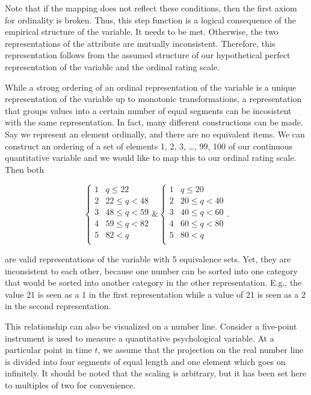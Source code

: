 \documentclass[utf8]{FrontiersinVancouver}
\begin{document}
Note that if the mapping does not reflect these conditions, then the first axiom for ordinality is broken. Thus, this step function is a logical consequence of the empirical structure of the variable. It needs to be met. Otherwise, the two representations of the attribute are mutually inconsistent. Therefore, this representation follows from the assumed structure of our hypothetical perfect representation of the variable and the ordinal rating scale. 

While a strong ordering of an ordinal representation of the variable is a unique representation of the variable up to monotonic transformations, a representation that groups values into a certain number of equal segments can be incosistent with the same representation. In fact, many different constructions can be made. Say we represent an element ordinally, and there are no equivalent items. We can construct an ordering of a set of elements {1, 2, 3, \ldots, 99, 100} of our continuous quantitative variable and we would like to map this to our ordinal rating scale. Then both

\[
\begin{cases} 
    1 & q \leq 22\\
    2 & 22 \leq q < 48\\
    3 & 48 \leq q < 59\\
    4 & 59 \leq q < 82\\    
    5 & 82 < q\\
\end{cases}
\&
\begin{cases} 
    1 & q \leq 20\\
    2 & 20 \leq q < 40\\
    3 & 40 \leq q < 60\\
    4 & 60 \leq q < 80\\    
    5 & 80 < q\\
\end{cases}.
\]

are valid representations of the variable with 5 equivalence sets. Yet, they are inconsistent to each other, because one number can be sorted into one category that would be sorted into another category in the other representation. E.g., the value 21 is seen as a 1 in the first representation while a value of 21 is seen as a 2 in the second representation. 

This relationship can also be visualized on a number line. Consider a five-point instrument is used to measure a quantitative psychological variable. At a particular point in time $t$, we assume that the projection on the real number line is divided into four segments of equal length and one element which goes on infinitely. It should be noted that the scaling is arbitrary, but it has been set here to multiples of two for convenience. 
\end{document}
